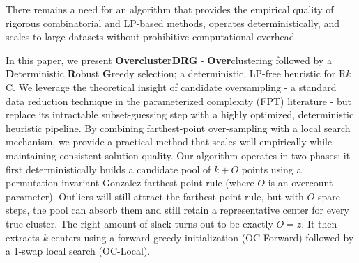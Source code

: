 \documentclass[twoside,leqno,twocolumn]{article}
\newcommand{\rkc}{R$k$C}
\begin{document}
There remains a need for an algorithm that provides the empirical quality of rigorous combinatorial and LP-based methods, operates deterministically, and scales to large datasets without prohibitive computational overhead.


In this paper, we present \textbf{OverclusterDRG} - \textbf{Over}clustering
followed by a \textbf{D}eterministic \textbf{R}obust \textbf{G}reedy
selection; a deterministic, LP-free heuristic for \rkc. We leverage the theoretical insight of candidate oversampling - a standard data reduction technique in the parameterized complexity (FPT) literature - but replace its intractable subset-guessing step with a highly optimized, deterministic heuristic pipeline. By combining farthest-point over-sampling with a local search mechanism, we provide a practical method that scales well empirically while maintaining consistent solution quality. Our algorithm operates in two phases: it first deterministically builds a candidate pool of $k+O$ points using a permutation-invariant Gonzalez farthest-point rule (where $O$ is an overcount parameter). Outliers will still attract the farthest-point rule, but with $O$ spare steps, the pool can absorb them and still retain a representative center for every true cluster. The right amount of slack turns out to be exactly $O=z$. It then extracts $k$ centers using a forward-greedy initialization (OC-Forward) followed by a 1-swap local search (OC-Local).
\end{document}
